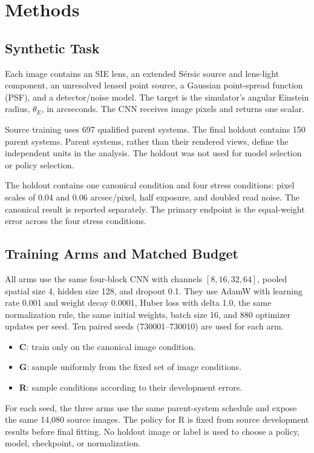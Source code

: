 \documentclass[letterpaper]{article}
\begin{document}
\section{Methods}

\subsection{Synthetic Task}

Each image contains an SIE lens, an extended S\'ersic source and lens-light
component, an unresolved lensed point source, a Gaussian point-spread function
(PSF), and a detector/noise model. The target is the simulator's angular
Einstein radius, $\theta_E$, in arcseconds. The CNN receives image pixels and
returns one scalar.

Source training uses 697 qualified parent systems. The final holdout contains
150 parent systems. Parent systems, rather than their rendered views, define
the independent units in the analysis. The holdout was not used for model
selection or policy selection.

The holdout contains one canonical condition and four stress conditions:
pixel scales of 0.04 and 0.06 arcsec/pixel, half exposure, and doubled read
noise. The canonical result is reported separately. The primary endpoint is
the equal-weight error across the four stress conditions.

\subsection{Training Arms and Matched Budget}

All arms use the same four-block CNN with channels $[8,16,32,64]$, pooled
spatial size 4, hidden size 128, and dropout 0.1. They use AdamW with learning
rate 0.001 and weight decay 0.0001, Huber loss with delta 1.0, the same
normalization rule, the same initial weights, batch size 16, and 880 optimizer
updates per seed. Ten paired seeds (730001--730010) are used for each arm.

\begin{itemize}
\item \textbf{C}: train only on the canonical image condition.
\item \textbf{G}: sample uniformly from the fixed set of image conditions.
\item \textbf{R}: sample conditions according to their development errors.
\end{itemize}

For each seed, the three arms use the same parent-system schedule and expose
the same 14,080 source images. The policy for R is fixed from source
development results before final fitting. No holdout image or label is used to
choose a policy, model, checkpoint, or normalization.
\end{document}
